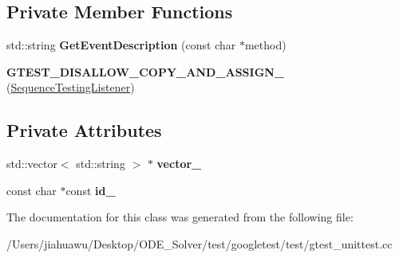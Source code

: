\subsection*{Private Member Functions}
\begin{DoxyCompactItemize}
\item 
\mbox{\label{class_sequence_testing_listener_adc3ddea0d1af961470237ed96433e945}} 
std\+::string {\bfseries Get\+Event\+Description} (const char $\ast$method)
\item 
\mbox{\label{class_sequence_testing_listener_a56de089e40314ad71db2ec3a56a87699}} 
{\bfseries G\+T\+E\+S\+T\+\_\+\+D\+I\+S\+A\+L\+L\+O\+W\+\_\+\+C\+O\+P\+Y\+\_\+\+A\+N\+D\+\_\+\+A\+S\+S\+I\+G\+N\+\_\+} (\mbox{\hyperlink{class_sequence_testing_listener}{Sequence\+Testing\+Listener}})
\end{DoxyCompactItemize}
\subsection*{Private Attributes}
\begin{DoxyCompactItemize}
\item 
\mbox{\label{class_sequence_testing_listener_a93b46c1c1e2eccdc09fda4fe96fa5998}} 
std\+::vector$<$ std\+::string $>$ $\ast$ {\bfseries vector\+\_\+}
\item 
\mbox{\label{class_sequence_testing_listener_af5abf1f122fac090d4bdf9de0735da96}} 
const char $\ast$const {\bfseries id\+\_\+}
\end{DoxyCompactItemize}


The documentation for this class was generated from the following file\+:\begin{DoxyCompactItemize}
\item 
/\+Users/jiahuawu/\+Desktop/\+O\+D\+E\+\_\+\+Solver/test/googletest/test/gtest\+\_\+unittest.\+cc\end{DoxyCompactItemize}
